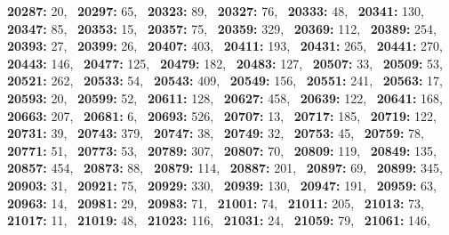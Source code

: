 \textbf{20287:} 20,\allowbreak~ 
\textbf{20297:} 65,\allowbreak~ 
\textbf{20323:} 89,\allowbreak~ 
\textbf{20327:} 76,\allowbreak~ 
\textbf{20333:} 48,\allowbreak~ 
\textbf{20341:} 130,\allowbreak~ 
\textbf{20347:} 85,\allowbreak~ 
\textbf{20353:} 15,\allowbreak~ 
\textbf{20357:} 75,\allowbreak~ 
\textbf{20359:} 329,\allowbreak~ 
\textbf{20369:} 112,\allowbreak~ 
\textbf{20389:} 254,\allowbreak~ 
\textbf{20393:} 27,\allowbreak~ 
\textbf{20399:} 26,\allowbreak~ 
\textbf{20407:} 403,\allowbreak~ 
\textbf{20411:} 193,\allowbreak~ 
\textbf{20431:} 265,\allowbreak~ 
\textbf{20441:} 270,\allowbreak~ 
\textbf{20443:} 146,\allowbreak~ 
\textbf{20477:} 125,\allowbreak~ 
\textbf{20479:} 182,\allowbreak~ 
\textbf{20483:} 127,\allowbreak~ 
\textbf{20507:} 33,\allowbreak~ 
\textbf{20509:} 53,\allowbreak~ 
\textbf{20521:} 262,\allowbreak~ 
\textbf{20533:} 54,\allowbreak~ 
\textbf{20543:} 409,\allowbreak~ 
\textbf{20549:} 156,\allowbreak~ 
\textbf{20551:} 241,\allowbreak~ 
\textbf{20563:} 17,\allowbreak~ 
\textbf{20593:} 20,\allowbreak~ 
\textbf{20599:} 52,\allowbreak~ 
\textbf{20611:} 128,\allowbreak~ 
\textbf{20627:} 458,\allowbreak~ 
\textbf{20639:} 122,\allowbreak~ 
\textbf{20641:} 168,\allowbreak~ 
\textbf{20663:} 207,\allowbreak~ 
\textbf{20681:} 6,\allowbreak~ 
\textbf{20693:} 526,\allowbreak~ 
\textbf{20707:} 13,\allowbreak~ 
\textbf{20717:} 185,\allowbreak~ 
\textbf{20719:} 122,\allowbreak~ 
\textbf{20731:} 39,\allowbreak~ 
\textbf{20743:} 379,\allowbreak~ 
\textbf{20747:} 38,\allowbreak~ 
\textbf{20749:} 32,\allowbreak~ 
\textbf{20753:} 45,\allowbreak~ 
\textbf{20759:} 78,\allowbreak~ 
\textbf{20771:} 51,\allowbreak~ 
\textbf{20773:} 53,\allowbreak~ 
\textbf{20789:} 307,\allowbreak~ 
\textbf{20807:} 70,\allowbreak~ 
\textbf{20809:} 119,\allowbreak~ 
\textbf{20849:} 135,\allowbreak~ 
\textbf{20857:} 454,\allowbreak~ 
\textbf{20873:} 88,\allowbreak~ 
\textbf{20879:} 114,\allowbreak~ 
\textbf{20887:} 201,\allowbreak~ 
\textbf{20897:} 69,\allowbreak~ 
\textbf{20899:} 345,\allowbreak~ 
\textbf{20903:} 31,\allowbreak~ 
\textbf{20921:} 75,\allowbreak~ 
\textbf{20929:} 330,\allowbreak~ 
\textbf{20939:} 130,\allowbreak~ 
\textbf{20947:} 191,\allowbreak~ 
\textbf{20959:} 63,\allowbreak~ 
\textbf{20963:} 14,\allowbreak~ 
\textbf{20981:} 29,\allowbreak~ 
\textbf{20983:} 71,\allowbreak~ 
\textbf{21001:} 74,\allowbreak~ 
\textbf{21011:} 205,\allowbreak~ 
\textbf{21013:} 73,\allowbreak~ 
\textbf{21017:} 11,\allowbreak~ 
\textbf{21019:} 48,\allowbreak~ 
\textbf{21023:} 116,\allowbreak~ 
\textbf{21031:} 24,\allowbreak~ 
\textbf{21059:} 79,\allowbreak~ 
\textbf{21061:} 146,\allowbreak~ 
